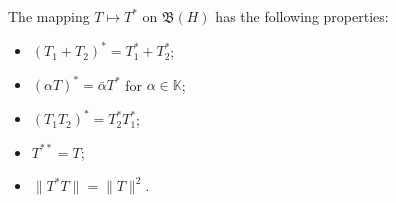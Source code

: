 The mapping $T \mapsto T^*$ on $\mathfrak{B}(H)$ has the following properties:
\begin{itemize}
\item[(i)] $(T_1 + T_2)^* = T_1^* + T_2^*$;
\item[(ii)] $(\alpha T)^* = \bar{\alpha} T^*$ for $\alpha \in \mathbb{K}$;
\item[(iii)] $(T_1 T_2)^* = T_2^* T_1^*$;
\item[(iv)] $T^{**} = T$;
\item[(v)] $\|T^* T\| = \|T\|^2$.
\end{itemize}
